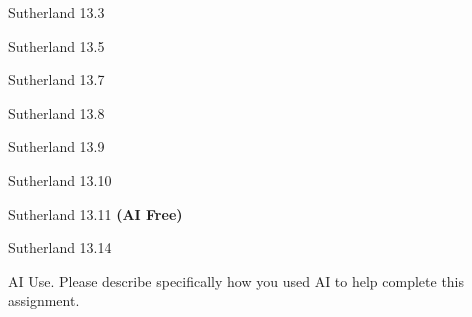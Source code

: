 \documentclass[minion]{homework}
\begin{document}
\begin{problems}

\problem Sutherland 13.3

\problem Sutherland 13.5

\problem Sutherland 13.7

\problem Sutherland 13.8

\problem Sutherland 13.9

\problem Sutherland 13.10

\problem Sutherland 13.11 \textbf{(AI Free)}

\problem Sutherland 13.14

\problem AI Use. Please describe specifically how you used AI to help complete this assignment.

\end{problems}
\end{document}
